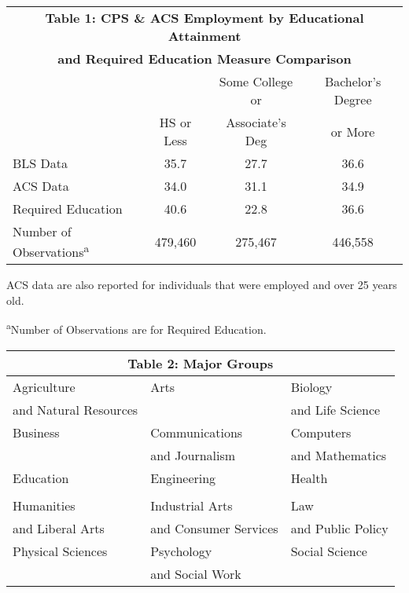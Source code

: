\documentclass[11pt]{article}
\theoremstyle{definition}
\begin{document}
\small{
\vspace{2.5mm}
\noindent
\begin{center}
\begin{tabular}{l c c  c}
\hline\hline
\multicolumn{4}{c}{\textbf{Table 1: CPS \& ACS Employment by Educational Attainment}} \\
\multicolumn{4}{c}{\textbf{and Required Education Measure Comparison}} \\
\hline
 & & Some College or  & Bachelor's Degree \\
  & HS or Less & Associate's Deg & or More \\
\hline
BLS Data & 35.7 & 27.7 & 36.6   \\
ACS Data & 34.0 & 31.1 & 34.9  \\
Required Education & 40.6 & 22.8 & 36.6  \\
\hline
Number of Observations\textsuperscript{a} & 479,460 & 275,467 & 446,558 \\
\hline\hline
\end{tabular} 
\end{center}} 
\hspace{10mm}\small{ACS data are also reported for individuals that were employed and over 25 years old.}  

\hspace{10mm}\small{\textsuperscript{a}Number of Observations are for Required Education.} 


\vspace{2.5mm}
\noindent
\begin{center}
\begin{tabular}{|l| l |l|}
\hline\hline
\multicolumn{3}{c}{\textbf{Table 2: Major Groups}} \\
\hline\hline \rowcolor{Gray}
 Agriculture & Arts & Biology  \\
  \rowcolor{Gray}
  and Natural Resources & & and Life Science \\
 \hline
 Business & Communications & Computers \\
   & and Journalism & and Mathematics \\
\hline  \rowcolor{Gray}
Education & Engineering & Health  \\
 \rowcolor{Gray}
 & & \\
 \hline
Humanities & Industrial Arts & Law \\
and Liberal Arts & and Consumer Services & and Public Policy\\
\hline  \rowcolor{Gray}
Physical Sciences & Psychology & Social Science \\
 \rowcolor{Gray}
 & and Social Work &   \\
  \hline\hline
\end{tabular} 
\end{center} 
\end{document}

